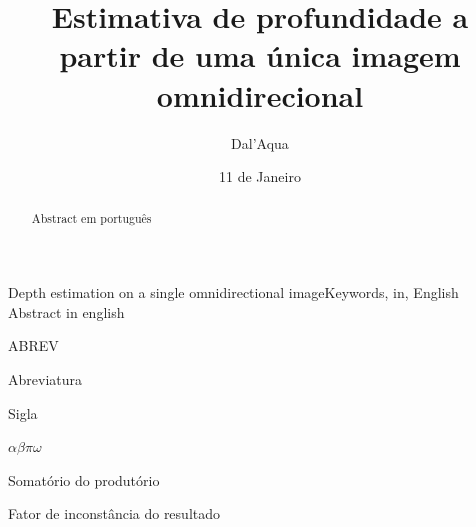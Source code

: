 \documentclass[cic,tc]{iiufrgs}
\title{Estimativa de profundidade a partir de uma única imagem omnidirecional}
\author{Dal'Aqua}{Lorenzo Pezzi}
\date{11 de Janeiro}{2018}
\begin{document}
\maketitle





\begin{abstract}
    Abstract em português
\end{abstract}

\begin{englishabstract}{Depth estimation on a single omnidirectional image}{Keywords, in, English}
    Abstract in english
\end{englishabstract}

\listoffigures

\listoftables

\begin{listofabbrv}{ABREV}
    \item[ABREV] Abreviatura
    \item[SIG] Sigla
\end{listofabbrv}

\begin{listofsymbols}{$\alpha\beta\pi\omega$}
    \item[$\sum{\frac{a}{b}}$] Somatório do produtório
    \item[$\alpha\beta\pi\omega$] Fator de inconstância do resultado
\end{listofsymbols}
\end{document}
